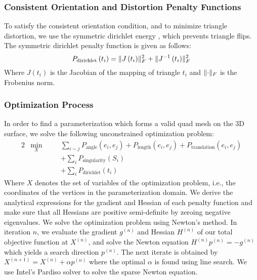 \subsubsection{Consistent Orientation and Distortion Penalty Functions}
To satisfy the consistent orientation condition, and to minimize triangle distortion, we use the symmetric dirichlet energy \cite{10.1145/2766947}, which prevents triangle flips. The symmetric dirichlet penalty function is given as follows:
$$
P_{\mathrm{dirichlet}}\left(t_i\right) = \lVert J\left(t_i\right)\rVert_F^2 + \lVert J^{-1}\left(t_i\right)\rVert_F^2 \nonumber
$$
Where $J\left(t_i\right)$ is the Jacobian of the mapping of triangle $t_i$ and $\lVert\cdot\rVert_F$ is the Frobenius norm.
\subsubsection{Optimization Process}
In order to find a parameterization which forms a valid quad mesh on the 3D surface, we solve the following unconstrained optimization problem:
\begin{alignat}{2}
  &\min_{X}
     &\quad & \sum_{i \sim j} P_{\mathrm{angle}}\left(e_i,e_j\right) + P_{\mathrm{length}}\left(e_i,e_j\right) + P_{\mathrm{translation}}\left(e_i,e_j\right) \nonumber\\ 
  &  &  & + \sum_{i} P_{\mathrm{singularity}}\left(S_i\right) \nonumber\\ 
  &  &  & + \sum_{i} P_{\mathrm{dirichlet}}\left(t_i\right) \nonumber
\end{alignat}
Where $X$ denotes the set of variables of the optimization problem, i.e., the coordinates of the vertices in the parameterization domain. We derive the analytical expressions for the gradient and Hessian of each penalty function and make sure that all Hessians are positive semi-definite by zeroing negative eigenvalues. We solve the optimization problem using Newton's method. In iteration $n$, we evaluate the gradient $g^{(n)}$ and Hessian $H^{(n)}$ of our total objective function at $X^{(n)}$, and solve the Newton equation $H^{(n)}p^{(n)}=-g^{(n)}$ which yields a search direction $p^{(n)}$. The next iterate is obtained by $X^{(n+1)} = X^{(n)} + \alpha p^{(n)}$ where the optimal $\alpha$ is found using line search. We use Intel's Pardiso solver to solve the sparse Newton equation.
